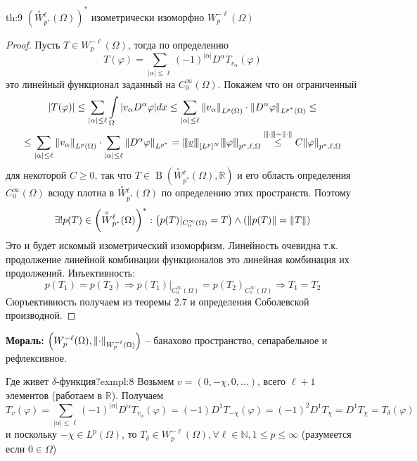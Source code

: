 \documentclass[12pt,a4paper]{article}
\newcommand{\intset}[1]{\int\limits_{#1}}
\newcommand{\Real}{\mathbb{R}}
\newcommand{\Natural}{\mathbb{N}}
\newcommand{\nnorm}[1]{{\left\vert\kern-0.25ex\left\vert\kern-0.25ex\left\vert #1 
		\right\vert\kern-0.25ex\right\vert\kern-0.25ex\right\vert}}
\newcommand{\zeroW}[2]{\overset{\circ}{W}{}_{#1}^{#2}}
\DeclareMathOperator{\bounded}{B}
\begin{document}
\begin{theorem}{}{th:9}
	$\left(\zeroW{p^*}{\ell} (\Omega)\right)^*$ изометрически изоморфно $W_p^{-\ell} (\Omega)$
\end{theorem}
\begin{proof}
	Пусть $T \in W_p^{-\ell} (\Omega)$, тогда по определению
	\begin{equation*}
		T (\varphi) = \sum\limits_{|\alpha| \leq \ell}{(-1)^{|\alpha|} D^\alpha T_{v_\alpha} (\varphi)}
	\end{equation*}
	это линейный функционал заданный на $C_0^\infty (\Omega)$. Покажем что он ограниченный
	\begin{multline*}
		|T(\varphi)| \leq \sum\limits_{|\alpha| \leq \ell}{\intset{\Omega}{|v_\alpha D^\alpha \varphi| dx}} \leq \sum\limits_{|\alpha| \leq \ell}{\norm{v_\alpha}_{L^p (\Omega)} \cdot \norm{D^\alpha \varphi}_{L^{p^*} (\Omega)}} \leq \\ \leq \sum\limits_{|\alpha| \leq \ell}{\norm{v_\alpha}_{L^p (\Omega)}} \cdot \sum\limits_{|\alpha| \leq \ell}{\norm{D^\alpha \varphi}_{L^{p^*}}} = \nnorm{\underline{v}}_{[L^p]^N} \nnorm{\varphi}_{p^*, \ell, \Omega} \overset{\nnorm{\cdot} \sim \norm{\cdot}}{\leq} C \norm{\varphi}_{p^*, \ell, \Omega}
	\end{multline*}
	для некоторой $C \geq 0$, так что $T \in \bounded\left(\zeroW{p^*}{\ell} (\Omega), \Real\right)$ и его область определения $C_0^\infty(\Omega)$ всюду плотна в $\zeroW{p^*}{\ell} (\Omega)$ по определению этих пространств. Поэтому 
	\begin{equation*}
		\exists!{p (T)} \in \left(\zeroW{p^*}{\ell} (\Omega)\right)^*: \left( p(T) |_{C_0^\infty (\Omega)} = T \right) \wedge \left( \norm{p (T)} = \norm{T} \right)
	\end{equation*}
	Это и будет искомый изометрический изоморфизм. Линейность очевидна т.к. продолжение линейной комбинации функционалов это линейная комбинация их продолжений. Инъективность:
	\begin{equation*}
		p(T_1) = p(T_2) \Rightarrow p(T_1) |_{C_0^\infty (\Omega)} = p(T_2)_{C_0^\infty (\Omega)} \Rightarrow T_1 = T_2
	\end{equation*} 
	Сюръективность получаем из теоремы 2.7 и определения Соболевской производной. 
\end{proof}
\textbf{Мораль:} $\left( W_p^{-\ell} (\Omega), \norm{\cdot}_{W_p^{-\ell} (\Omega)} \right)$ -- банахово пространство, сепарабельное и рефлексивное. 

\begin{example}{Где живет $\delta$-функция?}{exmpl:8}
	Возьмем $v = (0, -\chi, 0, ...)$, всего $\ell + 1$ элементов (работаем в $\Real$). Получаем 
	\begin{equation*}
		T_v (\varphi) = \sum\limits_{|\alpha| \leq \ell}{(-1)^{|\alpha|} D^\alpha T_{v_\alpha}(\varphi)} = (-1)D^1 T_{-\chi} (\varphi) = (-1)^2 D^1 T_{\chi} = D^1 T_{\chi} = T_\delta (\varphi)
	\end{equation*}
	и поскольку $-\chi \in L^p (\Omega)$, то $T_\delta \in W_p^{-\ell} (\Omega), \forall \ell \in \Natural, 1 \leq p \leq \infty$ (разумеется если $0 \in \Omega$)
\end{example}
\end{document}
